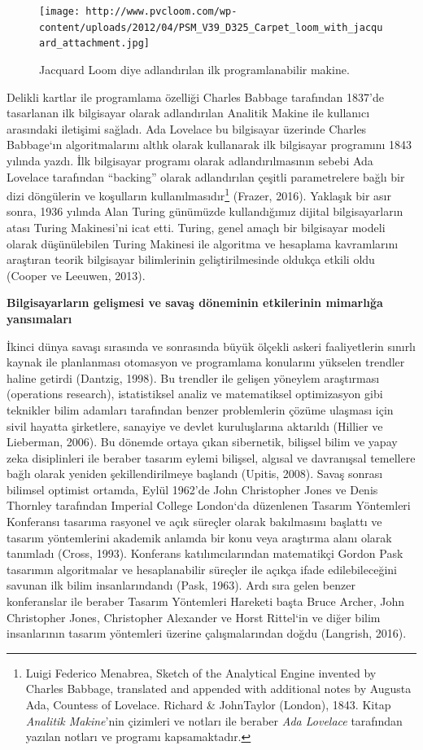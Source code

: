 \documentclass[12pt,turkish,a4paperpaper,]{report}
\begin{document}
\begin{figure}
\centering
\texttt{[image: http://www.pvcloom.com/wp-content/uploads/2012/04/PSM\_V39\_D325\_Carpet\_loom\_with\_jacquard\_attachment.jpg]}
\caption{Jacquard Loom diye adlandırılan ilk programlanabilir makine.
\label{JacquardLoom}}
\end{figure}

Delikli kartlar ile programlama özelliği Charles Babbage tarafından
1837'de tasarlanan ilk bilgisayar olarak adlandırılan Analitik Makine
ile kullanıcı arasındaki iletişimi sağladı. Ada Lovelace bu bilgisayar
üzerinde Charles Babbage`ın algoritmalarını altlık olarak kullanarak ilk
bilgisayar programını 1843 yılında yazdı. İlk bilgisayar programı olarak
adlandırılmasının sebebi Ada Lovelace tarafından ``backing'' olarak
adlandırılan çeşitli parametrelere bağlı bir dizi döngülerin ve
koşulların kullanılmasıdır\footnote{Luigi Federico Menabrea, Sketch of
  the Analytical Engine invented by Charles Babbage, translated and
  appended with additional notes by Augusta Ada, Countess of Lovelace.
  Richard \& JohnTaylor (London), 1843. Kitap \emph{Analitik Makine}'nin
  çizimleri ve notları ile beraber \emph{Ada Lovelace} tarafından
  yazılan notları ve programı kapsamaktadır.} (Frazer, 2016). Yaklaşık
bir asır sonra, 1936 yılında Alan Turing günümüzde kullandığımız dijital
bilgisayarların atası Turing Makinesi'ni icat etti. Turing, genel amaçlı
bir bilgisayar modeli olarak düşünülebilen Turing Makinesi ile algoritma
ve hesaplama kavramlarını araştıran teorik bilgisayar bilimlerinin
geliştirilmesinde oldukça etkili oldu (Cooper ve Leeuwen, 2013).

\textbf{Bilgisayarların gelişmesi ve savaş döneminin etkilerinin
mimarlığa yansımaları}

İkinci dünya savaşı sırasında ve sonrasında büyük ölçekli askeri
faaliyetlerin sınırlı kaynak ile planlanması otomasyon ve programlama
konularını yükselen trendler haline getirdi (Dantzig, 1998). Bu trendler
ile gelişen yöneylem araştırması (operations research), istatistiksel
analiz ve matematiksel optimizasyon gibi teknikler bilim adamları
tarafından benzer problemlerin çözüme ulaşması için sivil hayatta
şirketlere, sanayiye ve devlet kuruluşlarına aktarıldı (Hillier ve
Lieberman, 2006). Bu dönemde ortaya çıkan sibernetik, bilişsel bilim ve
yapay zeka disiplinleri ile beraber tasarım eylemi bilişsel, algısal ve
davranışsal temellere bağlı olarak yeniden şekillendirilmeye başlandı
(Upitis, 2008). Savaş sonrası bilimsel optimist ortamda, Eylül 1962'de
John Christopher Jones ve Denis Thornley tarafından Imperial College
London`da düzenlenen Tasarım Yöntemleri Konferansı tasarıma rasyonel ve
açık süreçler olarak bakılmasını başlattı ve tasarım yöntemlerini
akademik anlamda bir konu veya araştırma alanı olarak tanımladı (Cross,
1993). Konferans katılımcılarından matematikçi Gordon Pask tasarımın
algoritmalar ve hesaplanabilir süreçler ile açıkça ifade edilebileceğini
savunan ilk bilim insanlarındandı (Pask, 1963). Ardı sıra gelen benzer
konferanslar ile beraber Tasarım Yöntemleri Hareketi başta Bruce Archer,
John Christopher Jones, Christopher Alexander ve Horst Rittel`in ve
diğer bilim insanlarının tasarım yöntemleri üzerine çalışmalarından
doğdu (Langrish, 2016).
\end{document}
